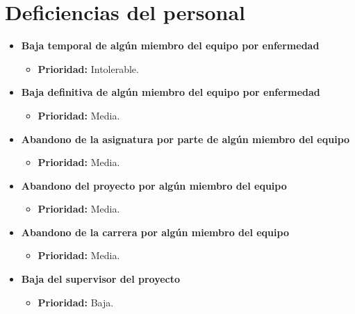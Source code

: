 \documentclass[spanish,a4paper,12pt]{report}	%
\begin{document}
\section{Deficiencias del personal}
	\begin{itemize}
		\item \textbf{Baja temporal de algún miembro del equipo por enfermedad}
			\begin{itemize}
				\item \textbf{Prioridad: }Intolerable.		%
			\end{itemize}
		
		\item \textbf{Baja definitiva de algún miembro del equipo por enfermedad}	
			\begin{itemize}
				\item \textbf{Prioridad: }Media.
			\end{itemize}
		
		\item \textbf{Abandono de la asignatura por parte de algún miembro del equipo}	
			\begin{itemize}
				\item \textbf{Prioridad: }Media.
			\end{itemize}
		
		\item \textbf{Abandono del proyecto por algún miembro del equipo}	
			\begin{itemize}
				\item \textbf{Prioridad: }Media.
			\end{itemize}
		
		\item \textbf{Abandono de la carrera por algún miembro del equipo}
			\begin{itemize}
				\item \textbf{Prioridad: }Media.
			\end{itemize}
		
		\item \textbf{Baja del supervisor del proyecto}
			\begin{itemize}
				\item \textbf{Prioridad: }Baja.
			\end{itemize}
	\end{itemize}
%
\end{document}

